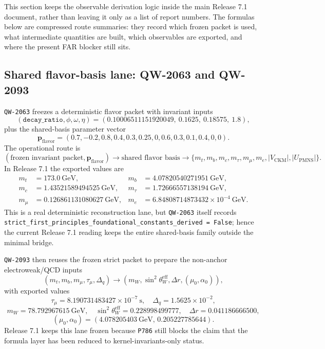 \documentclass[11pt,a4paper]{article}
\begin{document}
This section keeps the observable derivation logic inside the main Release 7.1
document, rather than leaving it only as a list of report numbers. The formulas
below are compressed route summaries: they record which frozen packet is used,
what intermediate quantities are built, which observables are exported, and
where the present FAR blocker still sits.

\subsection{Shared flavor-basis lane: QW-2063 and QW-2093}

\texttt{QW-2063} freezes a deterministic flavor packet with invariant inputs
\[
(\texttt{decay\_ratio},\phi,\omega,\eta)=
(0.10006511151920049,\ 0.1625,\ 0.18575,\ 1.8),
\]
plus the shared-basis parameter vector
\[
\mathbf{p}_{\mathrm{flavor}}=
(0.7,-0.2,0.8,0.4,0.3,0.25,0,0.6,0.3,0.1,0.4,0,0).
\]
The operational route is
\[
(\text{frozen invariant packet},\mathbf{p}_{\mathrm{flavor}})
\longrightarrow
\text{shared flavor basis}
\longrightarrow
\{m_t,m_b,m_c,m_\tau,m_\mu,m_e,|V_{\mathrm{CKM}}|,|U_{\mathrm{PMNS}}|\}.
\]
In Release 7.1 the exported values are
\[
\begin{aligned}
m_t&=173.0\ \mathrm{GeV}, & m_b&=4.07820540271951\ \mathrm{GeV}, \\
m_c&=1.43521589494525\ \mathrm{GeV}, & m_\tau&=1.72666557138194\ \mathrm{GeV}, \\
m_\mu&=0.126861131080627\ \mathrm{GeV}, & m_e&=6.84808714873432\times 10^{-4}\ \mathrm{GeV}.
\end{aligned}
\]
This is a real deterministic reconstruction lane, but \texttt{QW-2063} itself
records \texttt{strict\_first\_principles\_foundational\_constants\_derived =
False}; hence the current Release 7.1 reading keeps the entire shared-basis
family outside the minimal bridge.

\texttt{QW-2093} then reuses the frozen strict packet to prepare the non-anchor
electroweak/QCD inputs
\[
(m_t,m_b,m_\mu,\tau_\mu,\Delta_q)
\longrightarrow
(m_W,\sin^2\theta_W^{\mathrm{eff}},\Delta r,(\mu_0,\alpha_0)),
\]
with exported values
\[
\tau_\mu=8.190731483427\times 10^{-7}\ \mathrm{s},\quad
\Delta_q=1.5625\times 10^{-2},
\]
\[
m_W=78.792967615\ \mathrm{GeV},\quad
\sin^2\theta_W^{\mathrm{eff}}=0.228998499777,\quad
\Delta r=0.041186666500,
\]
\[
(\mu_0,\alpha_0)=
(4.078205403\ \mathrm{GeV},\,0.205227785644).
\]
Release 7.1 keeps this lane frozen because \texttt{P786} still blocks the claim
that the formula layer has been reduced to kernel-invariants-only status.
\end{document}
